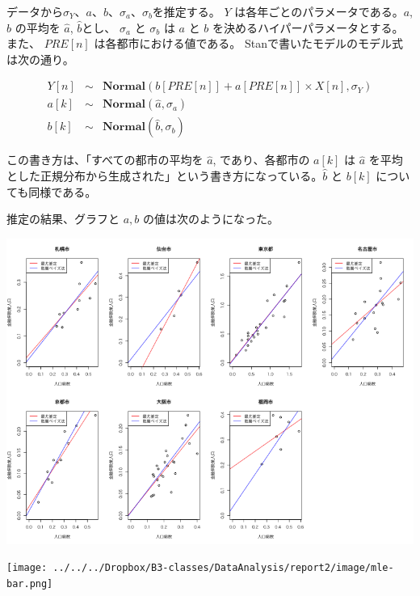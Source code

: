 \documentclass[a4j,xelatex,ja=standard,jafont=hiragino-pron, 9pt]{bxjsarticle}
\let\origfigure=\figure
\let\endorigfigure=\endfigure
\renewenvironment{figure}[1][]{%
  \origfigure[H]
}{%
  \endorigfigure
}
\begin{document}
データから\(\sigma_Y\)、\(a\)、\(b\)、\(\sigma_a\)、\(\sigma_b\)を推定する。
\(Y\) は各年ごとのパラメータである。\(a\), \(b\) の平均を \(\hat{a}\),
\(\hat{b}\)とし、 \(\sigma_a\) と \(\sigma_b\) は \(a\) と \(b\)
を決めるハイパーパラメータとする。また、 \(PRE[n]\)
は各都市における値である。 Stanで書いたモデルのモデル式は次の通り。

\begin{eqnarray}
  Y[n] &\sim& \textbf{Normal}(b[PRE[n]] + a[PRE[n]] \times X[n], \sigma_Y) \\
  a[k] &\sim& \textbf{Normal}(\hat{a}, \sigma_a) \\
  b[k] &\sim& \textbf{Normal}(\hat{b}, \sigma_b)
\end{eqnarray}

この書き方は、「すべての都市の平均を \(\hat{a}\), であり、各都市の
\(a[k]\) は \(\hat{a}\)
を平均とした正規分布から生成された」という書き方になっている。\(\hat{b}\)
と \(b[k]\) についても同様である。

推定の結果、グラフと $a, b$ の値は次のようになった。

\begin{figure}
\centering
\includegraphics[width=15cm]{../src/output/image/mle-mcmc.png}
\caption{階層ベイズ法(ハミルトンモンテカルロ法)と最尤推定法の比較}
\end{figure}

\begin{figure}
  \centering
  \texttt{[image: ../../../Dropbox/B3-classes/DataAnalysis/report2/image/mle-bar.png]}
  \caption{ハミルトンモンテカルロ法と最尤推定法の$a$ と $b$ の値の比較}
  \label{}
\end{figure}
\end{document}
